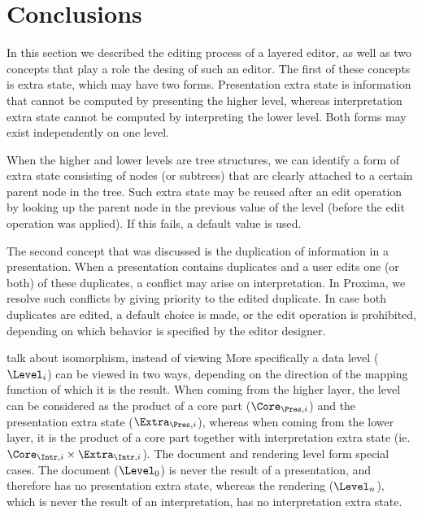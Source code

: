 

\section{Conclusions}

In this section we described the editing process of a layered editor, as well as two concepts that play a role the desing of such an  editor. The first of these concepts is extra state, which may have two forms. Presentation extra state is information that cannot be computed by presenting the higher level, whereas interpretation extra state cannot be computed by interpreting the lower level. Both forms may exist independently on one level.

When the higher and lower levels are tree structures, we can identify a form of extra state consisting of nodes (or subtrees) that are clearly attached to a certain parent node in the tree. Such extra state may be reused after an edit operation by looking up the parent node in the previous value of the level (before the edit operation was applied). If this fails, a default value is used.


The second concept that was discussed is the duplication of information in a presentation. When a presentation contains duplicates and a user edits one (or both) of these duplicates, a conflict may arise on interpretation. In Proxima, we resolve such conflicts by giving priority to the edited duplicate. In case both duplicates are edited, a default choice is made, or the edit operation is prohibited, depending on which behavior is specified by the editor designer.




\bc
\toHere
talk about isomorphism, instead of viewing
\fromHere
More specifically a data level ($\Level_{i}$) can be viewed in two ways, depending on the direction of the mapping function of which it is the result. When coming from the higher layer, the level can be considered as the product of a core part ($\Core_{\Pres,i}$) and the presentation extra state ($\Extra_{\Pres,i}$), whereas when coming from the lower layer, it is the product of a core part together with interpretation extra state (ie. $\Core_{\Intr,i} \times \Extra_{\Intr,i}$). The document and rendering level form special cases. The document ($\Level_0$) is never the result of a presentation, and therefore has no presentation extra state, whereas the rendering ($\Level_n$), which is never the result of an interpretation, has no interpretation extra state.

